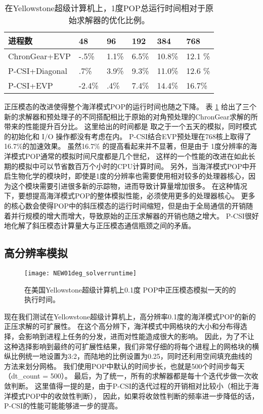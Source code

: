 \begin{table}[ht]
\begin{center}
\caption{在Yellowstone超级计算机上，1度POP总运行时间相对于原始求解器的优化比例。 \label{tab:improve_1}}
\begin{tabular}{|l||l|l|l|l|l|}
\hline
进程数 & 48  & 96  & 192 & 384 & 768\\\hline
\hline
ChronGear+EVP & -.5\% & 1.1\%  & 6.5\% & 10.8\%  & 12.1 \% \\\hline
P-CSI+Diagonal  & .7\% &3.9\% &9.3\%  &11.0\% & 12.6 \% \\\hline
P-CSI+EVP	      &-2.4\% & .4\%	& 7.4\%  & 14.4\% & 16.7\%\\\hline
\end{tabular}
\end{center}
\end{table}
正压模态的改进使得整个海洋模式POP的运行时间也随之下降。
表 \ref{tab:improve_1} 给出了三个新的求解器和预处理子的不同搭配相比于原始的对角预处理的ChronGear求解的所带来的性能提升百分比。 
这里给出的时间都是 取之于一个五天的模拟，同时模式的初始化和 I/O 操作都没有考虑在内。 
P-CSI结合EVP预处理在768核上取得了16.7\%的加速效果。
虽然16.7\% 的提高看起来并不显著，但是由于 1度分辨率的海洋模式POP通常的模拟时间尺度都是几个世纪， 这样的一个性能的改进在如此长期的模拟中可以节省数百万个小时的CPU计算时间。 
另外，当海洋模式POP中开启生物化学的模块时，即使是1度的分辨率也需要使用相对较多的处理器核心，因为这个模块需要引进很多新的示踪物，进而导致计算量增加很多。 
在这种情况下，要想提高海洋模式POP的整体模拟性能，必须使用更多的处理器核心。
更多的核心数会使得POP中的斜压模态的运行时间缩短，但是由于全局通信的开销随着并行规模的增大而增大，导致原始的正压求解器的开销也随之增大。 
P-CSI很好地化解了斜压模态计算量大与正压模态通信瓶颈之间的矛盾。

\subsection{高分辨率模拟}
\label{precond:exp:high}

\begin {figure}
\centering
\texttt{[image: NEW01deg\_solverruntime]}
\caption []{ 在美国Yellowstone超级计算机上0.1度 POP中正压模态模拟一天的的执行时间。\label {fig:runtime01_time}}
\end {figure}
现在我们测试在Yellowstone超级计算机上，高分辨率0.1度的海洋模式POP的新的正压求解的可扩展性。 
在这个高分辨下，海洋模式中网格块的大小和分布得选择，会影响到进程上任务的分发，进而对性能造成很大的影响。 
因此，为了不让这种选择影响到最终的可扩展性结果，我们非常仔细的将每个进程上的网格块的横纵比例统一地设置为3:2，而陆地的比例设置为0.25，同时还利用空间填充曲线的方法来划分网格。 
我们使用POP中默认的时间步长，也就是500个时间步每天（dt\_count = 500）。 
最后，为了统一，所有的求解器都是每十个迭代步做一次收敛判断。 
这里值得一提的是，由于P-CSI的迭代过程的开销相对比较小（相比于海洋模式POP中的收敛性判断）， 因此，如果将收敛性判断的频率进一步降低的话， P-CSI的性能可能能够进一步的提高。 
 
